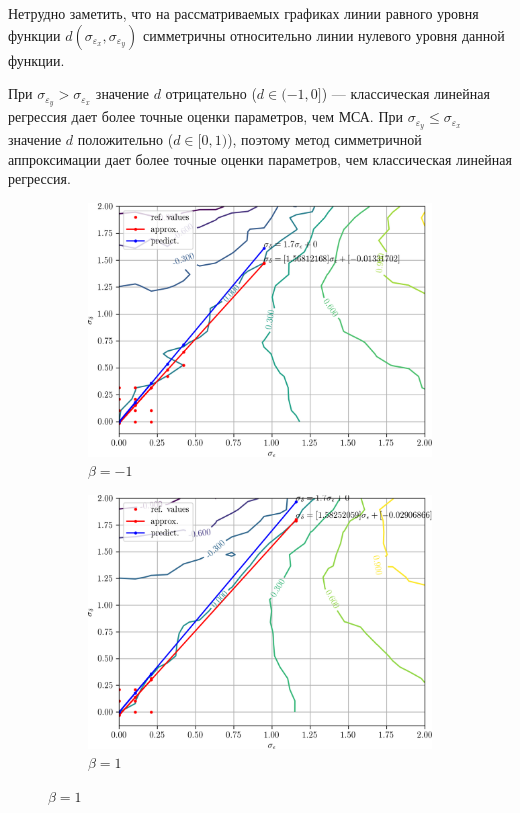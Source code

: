 Нетрудно заметить, что на рассматриваемых графиках линии равного уровня функции
\( d(\sigma_{\varepsilon_x}, \sigma_{\varepsilon_y}) \)
симметричны относительно линии нулевого уровня данной функции.

При \( \sigma_{\varepsilon_y} > \sigma_{\varepsilon_x} \)
значение \( d \) отрицательно (\( d \in ( -1, 0 ] \)) ---
классическая линейная регрессия дает более точные оценки параметров, чем МСА.
При \( \sigma_{\varepsilon_y} \le \sigma_{\varepsilon_x} \)
значение \( d \) положительно (\( d \in [0, 1 ) \)),
поэтому метод симметричной аппроксимации дает более точные оценки параметров,
чем классическая линейная регрессия.

\begin{figure}[p]
  \begin{subfigure}[b]{\linewidth}
    \centering
    \includegraphics[width=135mm]{fig/linear/param/beta--1_param-accs-diff-approx}
    \caption{\( \beta = -1 \)}
  \end{subfigure}

  \vspace{2\baselineskip}
  \begin{subfigure}[b]{\linewidth}
    \centering
    \includegraphics[width=135mm]{fig/linear/param/beta-1_param-accs-diff-approx}
    \caption{\( \beta = 1 \)}
  \end{subfigure}


\end{figure}

